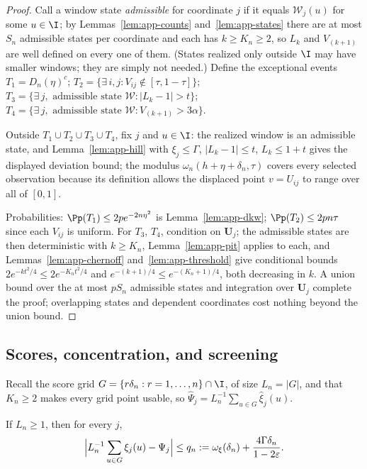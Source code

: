 \begin{proof}
Call a window state \emph{admissible} for coordinate $j$ if it equals
$\mathcal W_j(u)$ for some $u\in\I$; by
Lemmas~\ref{lem:app-counts} and~\ref{lem:app-states} there are at most
$S_n$ admissible states per coordinate and each has
$k\ge K_n\ge2$, so $L_k$ and $V_{(k+1)}$ are well defined on every one of
them.  (States realized only outside $\I$ may have smaller windows; they
are simply not needed.)  Define the exceptional events
$T_1=D_n(\eta)^c$;
$T_2=\{\exists\,i,j:V_{ij}\notin[\tau,1-\tau]\}$;
$T_3=\{\exists\,j,\text{ admissible state }\mathcal W:|L_k-1|>t\}$;
$T_4=\{\exists\,j,\text{ admissible state }\mathcal W:
V_{(k+1)}>3\alpha\}$.

Outside $T_1\cup T_2\cup T_3\cup T_4$, fix $j$ and $u\in\I$: the realized
window is an admissible state, and
Lemma~\ref{lem:app-hill} with $\xi_j\le\Gamma$, $|L_k-1|\le t$,
$L_k\le1+t$ gives the displayed deviation bound; the modulus
$\omega_n(h+\eta+\delta_n,\tau)$ covers every selected observation
because its definition allows the displaced point $v=U_{ij}$ to range
over all of $[0,1]$.

Probabilities: $\Pp(T_1)\le2pe^{-2n\eta^2}$ is
Lemma~\ref{lem:app-dkw}; $\Pp(T_2)\le2pn\tau$ since each $V_{ij}$ is
uniform.  For $T_3$, $T_4$, condition on $\bm U_j$; the admissible states
are then deterministic with $k\ge K_n$,
Lemma~\ref{lem:app-pit} applies to each, and
Lemmas~\ref{lem:app-chernoff} and~\ref{lem:app-threshold} give conditional
bounds $2e^{-kt^2/4}\le2e^{-K_nt^2/4}$ and
$e^{-(k+1)/4}\le e^{-(K_n+1)/4}$, both decreasing in $k$.  A union bound
over the at most $pS_n$ admissible states and
integration over $\bm U_j$ complete the proof; overlapping states and
dependent coordinates cost nothing beyond the union bound.
\end{proof}

\subsection{Scores, concentration, and screening}\label{app:screening}

Recall the score grid $G=\{r\delta_n:r=1,\ldots,n\}\cap\I$, of size
$L_n=|G|$, and that
$K_n\ge2$ makes every grid point usable, so
$\widehat\Psi_j=L_n^{-1}\sum_{u\in G}\widehat\xi_j(u)$.

\begin{lemma}[Quadrature]\label{lem:app-quadrature}
If $L_n\ge1$, then for every $j$,
\begin{equation}
 \Bigl|L_n^{-1}\sum_{u\in G}\xi_j(u)-\Psi_j\Bigr|
 \le q_n:=\omega_\xi(\delta_n)+\frac{4\Gamma\delta_n}{1-2\varepsilon}.
 \label{eq:A5app}
\end{equation}
\end{lemma}

